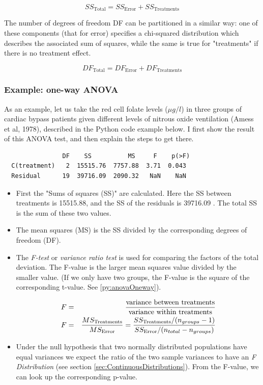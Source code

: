 \begin{equation}
  SS_\text{Total} = SS_\text{Error} + SS_\text{Treatments}
\end{equation}


The number of degrees of freedom DF can be partitioned in a similar way: one
of these components (that for error) specifies a chi-squared distribution
which describes the associated sum of squares, while the same is true for
"treatments" if there is no treatment effect.

\begin{equation}
  DF_\text{Total} = DF_\text{Error} + DF_\text{Treatments}
\end{equation}


\subsubsection{Example: one-way ANOVA}
As an example, let us take the red cell folate levels ($\mu g/l$) in three groups of cardiac bypass patients given different levels of nitrous oxide ventilation (Amess et al, 1978), described in the Python code example
below. I first show the result of this ANOVA test, and then explain the steps
to get there.

\begin{verbatim}
                DF    SS          MS     F    p(>F)
  C(treatment)   2  15515.76  7757.88  3.71  0.043
  Residual      19  39716.09  2090.32   NaN    NaN
\end{verbatim}

\begin{itemize}
  \item First the "Sums of squares (SS)" are calculated. Here the SS between treatments is 15515.88, and the SS of the residuals is 39716.09 . The total SS is the sum of these two values.
  \item The mean squares (MS) is the SS divided by the corresponding degrees of freedom (DF).
  \item The \emph{F-test} or \emph{variance ratio test} is used for comparing the factors of the total deviation. The F-value is the larger mean squares value divided by the smaller value. (If we only have two groups, the F-value is the square of the corresponding t-value. See \ref{py:anovaOneway}).

      \begin{eqnarray}
        F &=& \frac{\text{variance between treatments}}{\text{variance within treatments}} \\
        F &=& \frac{MS_\text{Treatments}}{MS_\text{Error}} = {{SS_\text{Treatments} / (n_{groups}-1)} \over {SS_\text{Error} / (n_{total}-n_{groups})}}
      \end{eqnarray}

  \item Under the null hypothesis that two normally distributed populations have equal variances we expect the ratio of the two sample variances to have an \emph{F Distribution} (see section \ref{sec:ContinuousDistributions}). From the F-value, we can look up the corresponding p-value.
\end{itemize}

